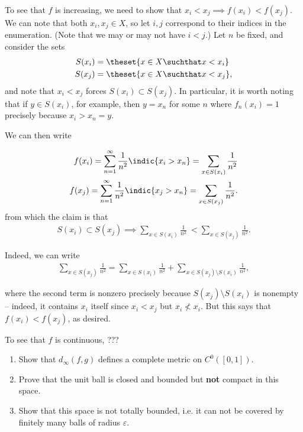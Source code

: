 \begin{solution}\hfill
  To see that $f$ is increasing, we need to show that $x_i < x_j \implies f(x_i) < f(x_j)$.
  We can note that both $x_i, x_j \in X$, so let $i,j$ correspond to their indices in the enumeration.
  (Note that we may or may not have $i < j$.) Let $n$ be fixed, and consider the sets
\[
  \begin{align*}
    S(x_i) &= \theset{x\in X \suchthat x < x_i} \\
    S(x_j) &= \theset{x\in X \suchthat x < x_j}
  ,\end{align*}
\]
and note that $x_i < x_j$ forces $S(x_i) \subset S(x_j)$. In particular, it is worth noting that if $y\in S(x_i)$, for example, then $y = x_n$ for some $n$ where $f_n(x_i) = 1$ precisely because $x_i > x_n = y$.

We can then write

\[
  \begin{align*}
    f(x_i) = \sum_{n=1}^\infty \frac 1 {n^2} \indic{x_i > x_n} = \sum_{x \in S(x_i)}\frac 1 {n^2} \\
    f(x_j) = \sum_{n=1}^\infty \frac 1 {n^2} \indic{x_j > x_n} = \sum_{x \in S(x_j)}\frac 1 {n^2}
  .\end{align*}
\]
  from which the claim is that
\[
  \begin{align*}
    S(x_i) \subset S(x_j) \implies \sum_{x \in S(x_i)}\frac 1 {n^2} ~< \sum_{x\in S(x_j)} \frac 1 {n^2}
  .\end{align*}
\]

  Indeed, we can write
\[
  \begin{align*}
    \sum_{x\in S(x_j)} \frac 1 {n^2} = \sum_{x\in S(x_i)} \frac 1 {n^2} + \sum_{x\in S(x_j)\setminus S(x_i)} \frac 1 {n^2}
  ,\end{align*}
\]

where the second term is nonzero precisely because $S(x_j)\setminus S(x_i)$ is nonempty -- indeed, it contains $x_i$ itself since $x_i < x_j$ but $x_i \not < x_i$. But this says that $f(x_i) < f(x_j)$, as desired.

To see that $f$ is continuous, ???

\end{solution}

\begin{problem}
\begin{enumerate}
  \item Show that $d_\infty(f, g)$ defines a complete metric on $C^0([0, 1])$.
  \item Prove that the unit ball is closed and bounded but \textbf{not} compact in this space.
  \item Show that this space is not totally bounded, i.e. it can not be covered by finitely many balls of radius $\varepsilon$.
\end{enumerate}
\end{problem}

